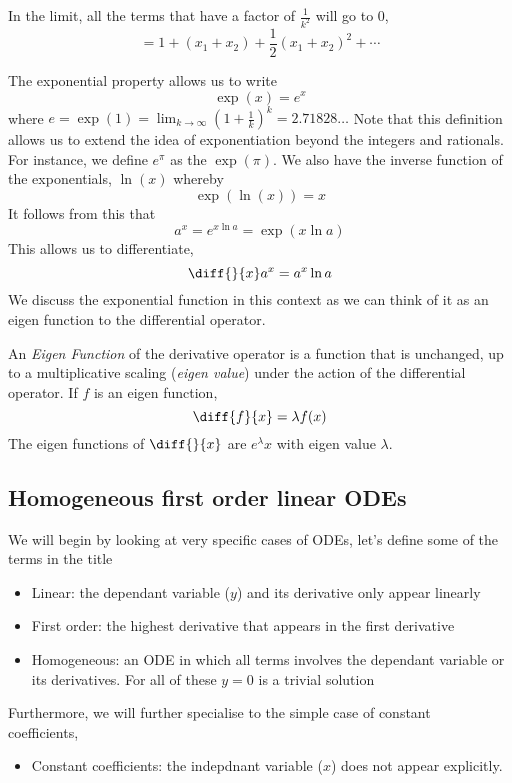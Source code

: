 \documentclass{article}
\begin{document}
In the limit, all the terms that have a factor of $\frac{1}{k^2}$ will go to $0$,
\[
    = 1 + (x_1 + x_2) + \frac{1}{2}(x_1 + x_2)^2 + \cdots
\]


The exponential property allows us to write
\[
    \exp(x) = e^x
\]
where $e = \exp(1) = \lim_{k \rightarrow \infty}(1+\frac{1}{k})^k = 2.71828\ldots$ Note that this definition allows us to extend the idea of exponentiation beyond the integers and rationals. 
For instance, we define $e^\pi$ as the $\exp(\pi)$. We also have the inverse function of the exponentials, $\ln(x)$ whereby
\[
  \exp(\ln(x)) = x  
\]
It follows from this that
\[
    a^x = e^{x \ln a} = \exp(x \ln a) 
\]
This allows us to differentiate,
\[
    \diff{}{x}a^x = a^x \ln a
\]
We discuss the exponential function in this context as we can think of it as an eigen function to the differential operator.

\begin{defi}
    An \emph{Eigen Function} of the derivative operator is a function that is unchanged, up to a multiplicative scaling (\emph{eigen value}) under the action of the differential operator. If $f$ is an eigen function,
    \[
        \diff{f}{x} = \lambda f(x)  
    \]
    The eigen functions of $\diff{}{x}$ are $e^\lambda x$ with eigen value $\lambda$.
\end{defi}

\subsection{Homogeneous first order linear ODEs}
We will begin by looking at very specific cases of ODEs, let's define some of the terms in the title
\begin{itemize}
    \item Linear: the dependant variable ($y$) and its derivative only appear linearly
    \item First order: the highest derivative that appears in the first derivative
    \item Homogeneous: an ODE in which all terms involves the dependant variable or its derivatives. For all of these $y=0$ is a trivial solution
\end{itemize}
Furthermore, we will further specialise to the simple case of constant coefficients,\
\begin{itemize}
    \item Constant coefficients: the indepdnant variable ($x$) does not appear explicitly.
\end{itemize}
\end{document}
